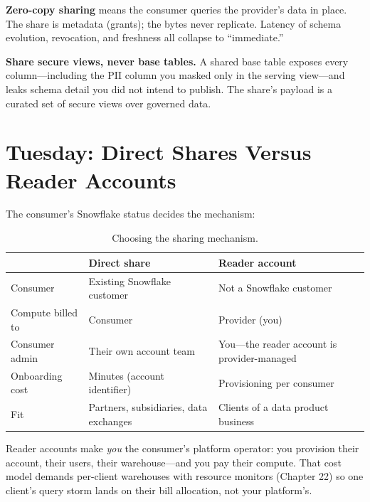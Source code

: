 \begin{definitionbox}
\textbf{Zero-copy sharing} means the consumer queries the provider's data in place. The share is metadata (grants); the bytes never replicate. Latency of schema evolution, revocation, and freshness all collapse to ``immediate.''
\end{definitionbox}

\begin{pitfall}
\textbf{Share secure views, never base tables.} A shared base table exposes every column---including the PII column you masked only in the serving view---and leaks schema detail you did not intend to publish. The share's payload is a curated set of secure views over governed data.
\end{pitfall}

\section{Tuesday: Direct Shares Versus Reader Accounts}
The consumer's Snowflake status decides the mechanism:

\begin{table}[H]
\centering
\small
\begin{tabular}{@{}p{4.2cm}p{4.8cm}p{4.8cm}@{}}
\toprule
 & \textbf{Direct share} & \textbf{Reader account} \\
\midrule
Consumer & Existing Snowflake customer & Not a Snowflake customer \\
Compute billed to & Consumer & Provider (you) \\
Consumer admin & Their own account team & You---the reader account is provider-managed \\
Onboarding cost & Minutes (account identifier) & Provisioning per consumer \\
Fit & Partners, subsidiaries, data exchanges & Clients of a data product business \\
\bottomrule
\end{tabular}
\caption{Choosing the sharing mechanism.}
\label{tab:chapter19-share-types}
\end{table}

Reader accounts make \emph{you} the consumer's platform operator: you provision their account, their users, their warehouse---and you pay their compute. That cost model demands per-client warehouses with resource monitors (Chapter 22) so one client's query storm lands on their bill allocation, not your platform's.

